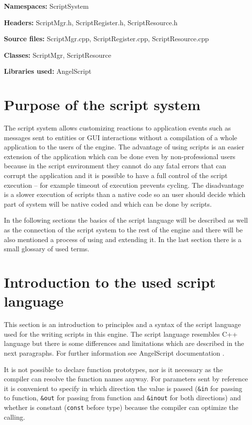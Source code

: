 \noindent\textbf{Namespaces:} ScriptSystem

\noindent\textbf{Headers:} ScriptMgr.h, ScriptRegister.h, ScriptResource.h

\noindent\textbf{Source files:} ScriptMgr.cpp, ScriptRegister.cpp, ScriptResource.cpp

\noindent\textbf{Classes:} ScriptMgr, ScriptResource

\noindent\textbf{Libraries used:} AngelScript

\section{Purpose of the script system}

The script system allows customizing reactions to application events such as messages sent to entities or GUI interactions without a compilation of a whole application to the users of the engine. The advantage of using scripts is an easier extension of the application which can be done even by non-professional users because in the script environment they cannot do any fatal errors that can corrupt the application and it is possible to have a full control of the script execution -- for example timeout of execution prevents cycling. The disadvantage is a slower execution of scripts than a native code so an user should decide which part of system will be native coded and which can be done by scripts.

In the following sections the basics of the script language will be described as well as the connection of the script system to the rest of the engine and there will be also mentioned a process of using and extending it. In the last section there is a small glossary of used terms.

\section{Introduction to the used script language}
\label{script-language}

This section is an introduction to principles and a syntax of the script language used for the writing scripts in this engine. The script language resembles C++ language but there is some differences and limitations which are described in the next paragraphs. For further information see AngelScript documentation \cite{angelscript}.

It is not possible to declare function prototypes, nor is it necessary as the compiler can resolve the function names anyway. For parameters sent by reference it is convenient to specify in which direction the value is passed (\verb/&in/ for passing to function, \verb/&out/ for passing from function and \verb/&inout/ for both directions) and whether is constant (\verb/const/ before type) because the compiler can optimize the calling.

